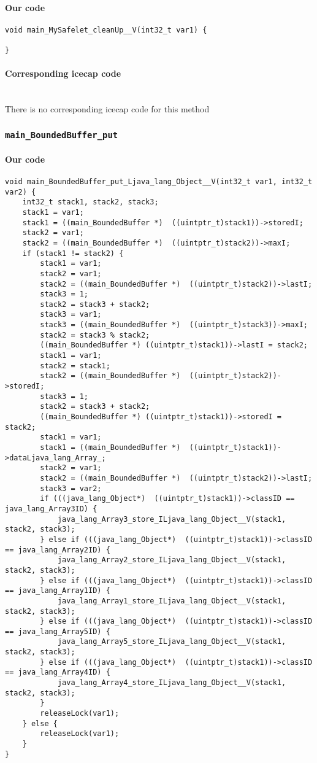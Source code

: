 \paragraph{Our code}\hfill
\begin{lstlisting}[firstnumber=749]
void main_MySafelet_cleanUp__V(int32_t var1) {
	
}
\end{lstlisting}

\paragraph{Corresponding icecap code}\hfill\\
There is no corresponding icecap code for this method

\subsubsection{\texttt{main\_BoundedBuffer\_put}}

\paragraph{Our code}\hfill
\begin{lstlisting}[firstnumber=888]
void main_BoundedBuffer_put_Ljava_lang_Object__V(int32_t var1, int32_t var2) {
	int32_t stack1, stack2, stack3;
	stack1 = var1;
	stack1 = ((main_BoundedBuffer *)  ((uintptr_t)stack1))->storedI;
	stack2 = var1;
	stack2 = ((main_BoundedBuffer *)  ((uintptr_t)stack2))->maxI;
	if (stack1 != stack2) {
		stack1 = var1;
		stack2 = var1;
		stack2 = ((main_BoundedBuffer *)  ((uintptr_t)stack2))->lastI;
		stack3 = 1;
		stack2 = stack3 + stack2;
		stack3 = var1;
		stack3 = ((main_BoundedBuffer *)  ((uintptr_t)stack3))->maxI;
		stack2 = stack3 % stack2;
		((main_BoundedBuffer *) ((uintptr_t)stack1))->lastI = stack2;
		stack1 = var1;
		stack2 = stack1;
		stack2 = ((main_BoundedBuffer *)  ((uintptr_t)stack2))->storedI;
		stack3 = 1;
		stack2 = stack3 + stack2;
		((main_BoundedBuffer *) ((uintptr_t)stack1))->storedI = stack2;
		stack1 = var1;
		stack1 = ((main_BoundedBuffer *)  ((uintptr_t)stack1))->dataLjava_lang_Array_;
		stack2 = var1;
		stack2 = ((main_BoundedBuffer *)  ((uintptr_t)stack2))->lastI;
		stack3 = var2;
		if (((java_lang_Object*)  ((uintptr_t)stack1))->classID == java_lang_Array3ID) {
			java_lang_Array3_store_ILjava_lang_Object__V(stack1, stack2, stack3);
		} else if (((java_lang_Object*)  ((uintptr_t)stack1))->classID == java_lang_Array2ID) {
			java_lang_Array2_store_ILjava_lang_Object__V(stack1, stack2, stack3);
		} else if (((java_lang_Object*)  ((uintptr_t)stack1))->classID == java_lang_Array1ID) {
			java_lang_Array1_store_ILjava_lang_Object__V(stack1, stack2, stack3);
		} else if (((java_lang_Object*)  ((uintptr_t)stack1))->classID == java_lang_Array5ID) {
			java_lang_Array5_store_ILjava_lang_Object__V(stack1, stack2, stack3);
		} else if (((java_lang_Object*)  ((uintptr_t)stack1))->classID == java_lang_Array4ID) {
			java_lang_Array4_store_ILjava_lang_Object__V(stack1, stack2, stack3);
		}
		releaseLock(var1);
	} else {
		releaseLock(var1);
	}
}
\end{lstlisting}

